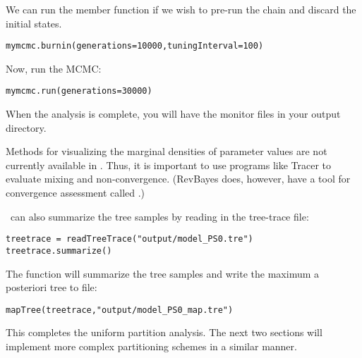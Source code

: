 We can run the  member function if we wish to pre-run the chain and discard the initial states. 
{\tt \begin{snugshade*}
\begin{lstlisting}
mymcmc.burnin(generations=10000,tuningInterval=100)
\end{lstlisting}
\end{snugshade*}}


Now, run the MCMC:
{\tt \begin{snugshade*}
\begin{lstlisting}
mymcmc.run(generations=30000)
\end{lstlisting}
\end{snugshade*}}

When the analysis is complete, you will have the monitor files in your output directory.

Methods for visualizing the marginal densities of parameter values are not currently available in \RevBayes. Thus, it is important to use programs like Tracer \citep{rambaut09} to evaluate mixing and non-convergence. (RevBayes does, however, have a tool for convergence assessment called .)

\RevBayes~can also summarize the tree samples by reading in the tree-trace file:
{\tt \begin{snugshade*}
\begin{lstlisting}
treetrace = readTreeTrace("output/model_PS0.tre")
treetrace.summarize()
\end{lstlisting}
\end{snugshade*}}


The  function will summarize the tree samples and write the maximum a posteriori tree to file:
{\tt \begin{snugshade*}
\begin{lstlisting}
mapTree(treetrace,"output/model_PS0_map.tre")
\end{lstlisting}
\end{snugshade*}}

This completes the uniform partition analysis.
The next two sections will implement more complex partitioning schemes in a similar manner.
